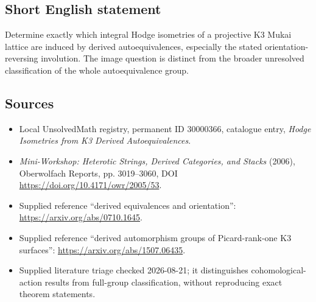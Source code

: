 \documentclass[11pt]{article}
\begin{document}
\subsection{Short English statement}
Determine exactly which integral Hodge isometries of a projective K3 Mukai lattice are induced by derived autoequivalences, especially the stated orientation-reversing involution. The image question is distinct from the broader unresolved classification of the whole autoequivalence group.
\subsection{Sources}
\begin{itemize}
\item Local UnsolvedMath registry, permanent ID 30000366, catalogue entry, \emph{Hodge Isometries from K3 Derived Autoequivalences}.
\item \emph{Mini-Workshop: Heterotic Strings, Derived Categories, and Stacks} (2006), Oberwolfach Reports, pp. 3019--3060, DOI \url{https://doi.org/10.4171/owr/2005/53}.
\item Supplied reference ``derived equivalences and orientation'': \url{https://arxiv.org/abs/0710.1645}.
\item Supplied reference ``derived automorphism groups of Picard-rank-one K3 surfaces'': \url{https://arxiv.org/abs/1507.06435}.
\item Supplied literature triage checked 2026-08-21; it distinguishes cohomological-action results from full-group classification, without reproducing exact theorem statements.
\end{itemize}
\end{document}

